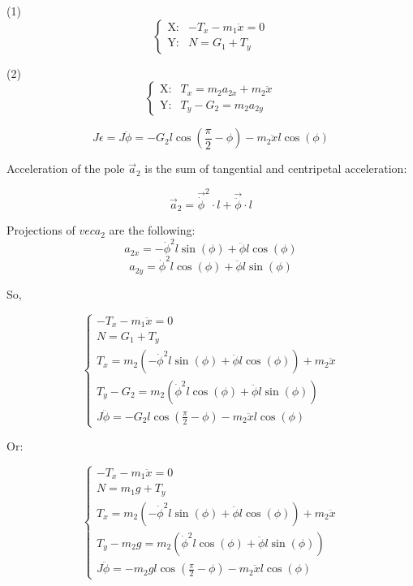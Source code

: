 \documentclass{article}
\begin{document}
(1) 
\[
\begin{cases}
  \text{X:} & -T_x - m_1 \ddot x = 0 \\
  \text{Y:} & N = G_1 + T_y
\end{cases}
\]

(2) 
\[
\begin{cases}
  \text{X:} & T_x = m_2 a_{2x} + m_2 \ddot x\\
  \text{Y:} & T_y - G_2 = m_2 a_{2y}
\end{cases}
\]




\[J \epsilon = J \ddot \phi = -G_2 l \cos(\frac{\pi}{2} - \phi) - m_2 \ddot x l \cos(\phi)\]

Acceleration of the pole $\vec a_2$ is the sum of tangential and centripetal acceleration:

\[\vec{a}_2 = \vec{\dot{\phi}}^2 \cdot l + \vec{\ddot{\phi}} \cdot l\]

Projections of $vec{a}_2$ are the following:
\[a_{2x} = -\dot{\phi}^2 l \sin(\phi) + \ddot{\phi} l \cos(\phi)\]
\[a_{2y} = \dot{\phi}^2 l \cos(\phi) + \ddot{\phi} l \sin(\phi)\]

So, 

\[
\begin{cases}
  -T_x - m_1 \ddot x = 0 \\
  N = G_1 + T_y\\
  T_x = m_2 (-\dot{\phi}^2 l \sin(\phi) + \ddot{\phi} l \cos(\phi)) + m_2 \ddot x\\
  T_y - G_2 = m_2 (\dot{\phi}^2 l \cos(\phi) + \ddot{\phi} l \sin(\phi))\\
  J \ddot \phi = -G_2 l \cos(\frac{\pi}{2} - \phi) - m_2 \ddot x l \cos(\phi)
\end{cases}
\]

Or:

\[
\begin{cases}
  -T_x - m_1 \ddot x = 0 \\
  N = m_1g + T_y\\
  T_x = m_2 (-\dot{\phi}^2 l \sin(\phi) + \ddot{\phi} l \cos(\phi)) + m_2 \ddot x\\
  T_y - m_2g = m_2 (\dot{\phi}^2 l \cos(\phi) + \ddot{\phi} l \sin(\phi))\\
  J \ddot \phi = -m_2g l \cos(\frac{\pi}{2} - \phi) - m_2 \ddot x l \cos(\phi)
\end{cases}
\]
\end{document}
